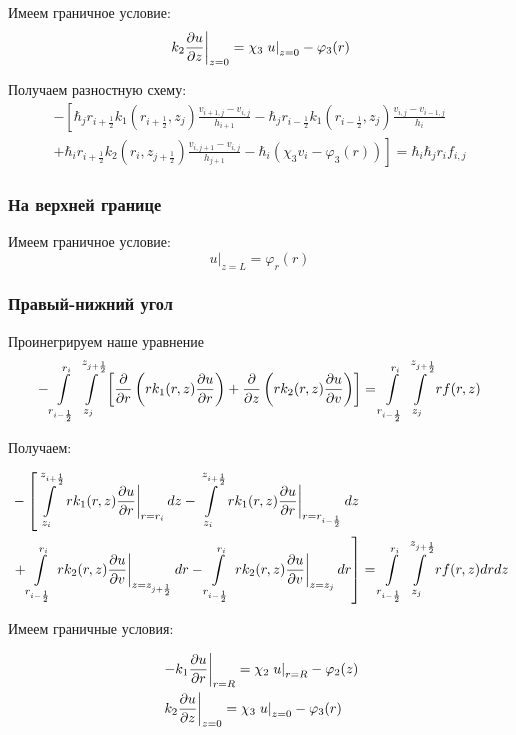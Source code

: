 Имеем граничное условие:
\[
  \left . k_2 \pdv{u}{z} \right \vert_{z=0} = \chi_3 \left . u \right \vert_{z=0} - \varphi_3(r)
\]

Получаем разностную схему:
\begin{align*}
  - \left [ 
  \hbar_j r_{i+\frac{1}{2}} k_1(r_{i+\frac{1}{2}}, z_j) \frac{v_{i+1, j} - v_{i, j}}{h_{i + 1}}
  - \hbar_j r_{i-\frac{1}{2}} k_1(r_{i-\frac{1}{2}}, z_j) \frac{v_{i, j} - v_{i - 1, j}}{h_{i}}
  \right . \\
  \left .
  + \hbar_i r_{i+\frac{1}{2}} k_2(r_i, z_{j+\frac{1}{2}}) \frac{v_{i, j + 1} - v_{i, j}}{h_{j + 1}}
  - \hbar_i(\chi_3 v_i - \varphi_3(r))
  \right ]  = \hbar_i \hbar_j r_i f_{i, j}
\end{align*}

\subsubsection{На верхней границе}
Имеем граничное условие:
\[
  \left . u \right \vert_{z=L} = \varphi_r(r) 
\]

\subsubsection{Правый-нижний угол}

Проинегрируем наше уравнение
\[
  - \int\limits^{r_{i }}_{r_{i -\frac{1}{2}}} \int\limits^{z_{j +\frac{1}{2}}}_{z_{j }} \left [ \pdv{}{r} \left ( r k_1(r, z) \pdv{u}{r} \right ) 
  + \pdv{}{z} \left ( rk_2(r, z)\pdv{u}{v} \right ) \right ] = \int\limits^{r_{i }}_{r_{i -\frac{1}{2}}} \int\limits^{z_{j +\frac{1}{2}}}_{z_{j }} rf(r, z)
\]

Получаем:

\begin{align*}
  &- \left [
   \int\limits^{z_{i+\frac{1}{2}}}_{z_{i}}  \left . r k_1(r, z) \pdv{u}{r} \right \vert_{r = r_i} dz
  - \int\limits^{z_{i+\frac{1}{2}}}_{z_{i}} \left . r k_1(r, z) \pdv{u}{r} \right \vert_{r = r_{i - \frac{1}{2}}} dz
  \right . \\
  &\left . + \int\limits^{r_{i}}_{r_{i-\frac{1}{2}}} \left . rk_2(r, z)\pdv{u}{v} \right \vert_{z = z_{j + \frac{1}{2}}} dr
  - \int\limits^{r_{i}}_{r_{i-\frac{1}{2}}} \left . rk_2(r, z)\pdv{u}{v} \right \vert_{z = z_{j}} dr
  \right ] = \int\limits^{r_{i }}_{r_{i -\frac{1}{2}}} \int\limits^{z_{j +\frac{1}{2}}}_{z_{j }} rf(r, z) dr dz
\end{align*}

Имеем граничные условия:

\begin{align*}
  &\left . -k_1 \pdv{u}{r} \right \vert_{r=R} = \chi_2 \left . u \right \vert_{r=R} - \varphi_2(z) \\
  &\left . k_2 \pdv{u}{z} \right \vert_{z=0} = \chi_3 \left . u \right \vert_{z=0} - \varphi_3(r) 
\end{align*}

